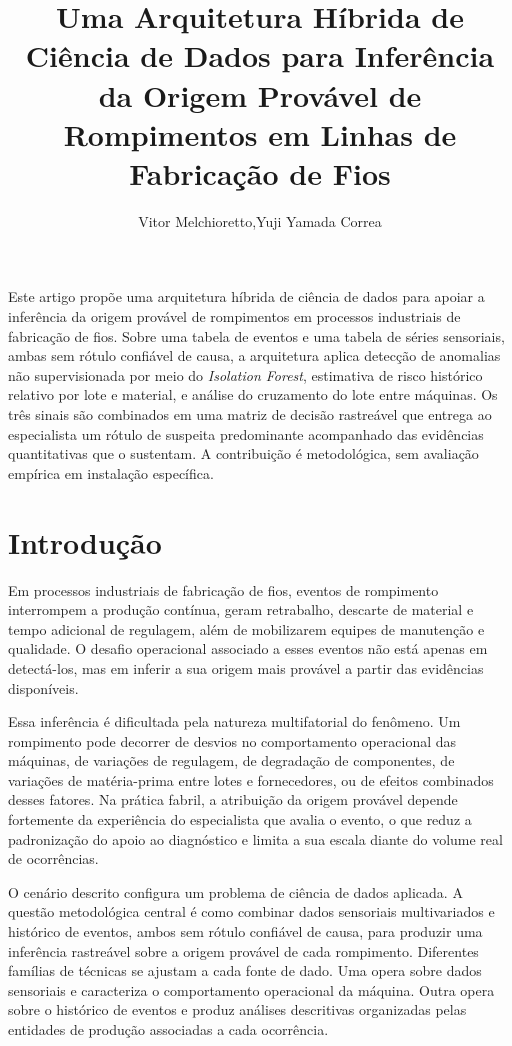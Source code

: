 \documentclass[12pt]{article}
\title{Uma Arquitetura Híbrida de Ciência de Dados para Inferência da Origem Provável de Rompimentos em Linhas de Fabricação de Fios}
\author{Vitor Melchioretto\inst{1},Yuji Yamada Correa\inst{2}}
\begin{document}
\maketitle

\begin{resumo}
Este artigo propõe uma arquitetura híbrida de ciência de dados para apoiar a inferência da origem provável de rompimentos em processos industriais de fabricação de fios. Sobre uma tabela de eventos e uma tabela de séries sensoriais, ambas sem rótulo confiável de causa, a arquitetura aplica detecção de anomalias não supervisionada por meio do \textit{Isolation Forest}, estimativa de risco histórico relativo por lote e material, e análise do cruzamento do lote entre máquinas. Os três sinais são combinados em uma matriz de decisão rastreável que entrega ao especialista um rótulo de suspeita predominante acompanhado das evidências quantitativas que o sustentam. A contribuição é metodológica, sem avaliação empírica em instalação específica.
\end{resumo}


\section{Introdução}
%
{Em processos industriais de fabricação de fios, eventos de rompimento interrompem a produção contínua, geram retrabalho, descarte de material e tempo adicional de regulagem, além de mobilizarem equipes de manutenção e qualidade. O desafio operacional associado a esses eventos não está apenas em detectá-los, mas em inferir a sua origem mais provável a partir das evidências disponíveis.}
%

%
{Essa inferência é dificultada pela natureza multifatorial do fenômeno. Um rompimento pode decorrer de desvios no comportamento operacional das máquinas, de variações de regulagem, de degradação de componentes, de variações de matéria-prima entre lotes e fornecedores, ou de efeitos combinados desses fatores. Na prática fabril, a atribuição da origem provável depende fortemente da experiência do especialista que avalia o evento, o que reduz a padronização do apoio ao diagnóstico e limita a sua escala diante do volume real de ocorrências.}
%

%
{O cenário descrito configura um problema de ciência de dados aplicada. A questão metodológica central é como combinar dados sensoriais multivariados e histórico de eventos, ambos sem rótulo confiável de causa, para produzir uma inferência rastreável sobre a origem provável de cada rompimento. Diferentes famílias de técnicas se ajustam a cada fonte de dado. Uma opera sobre dados sensoriais e caracteriza o comportamento operacional da máquina. Outra opera sobre o histórico de eventos e produz análises descritivas organizadas pelas entidades de produção associadas a cada ocorrência.}
%
\end{document}

